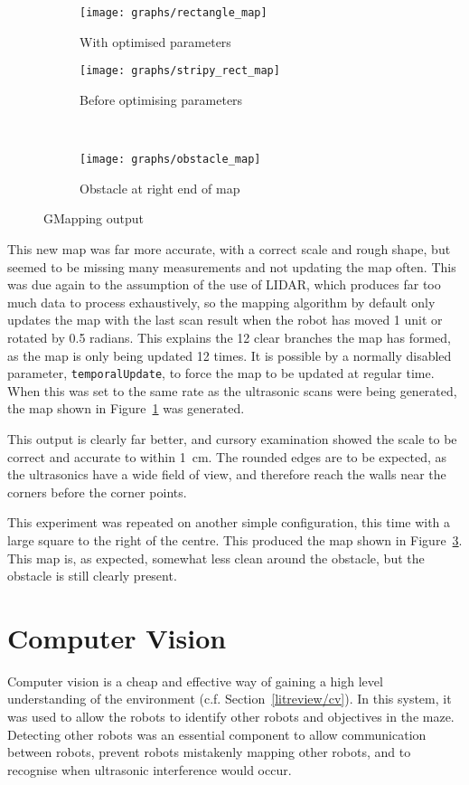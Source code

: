 \begin{figure}[!htb]
\centering
	\begin{subfigure}[b]{0.5\textwidth}
		\texttt{[image: graphs/rectangle\_map]}
		\caption{With optimised parameters}
		\label{fig:gmapping_output/rect}
	\end{subfigure}

  \centering
  \begin{subfigure}[b]{0.4\textwidth}
    \texttt{[image: graphs/stripy\_rect\_map]}
    \caption{Before optimising parameters}
    \label{fig:gmapping_output/stripy}
  \end{subfigure}
  ~
  \begin{subfigure}[b]{0.4\textwidth}
    \texttt{[image: graphs/obstacle\_map]}
    \caption{Obstacle at right end of map}
    \label{fig:gmapping_output/obstacle}
  \end{subfigure}
  \caption{GMapping output}\label{fig:gmapping_output}
\end{figure}


This new map was far more accurate, with a correct scale and rough shape, but seemed to be missing many measurements
and not updating the map often. This was due again to the assumption of the use of LIDAR, which produces far too
much data to process exhaustively, so the mapping algorithm by default only updates the map with the last scan result
when the robot has moved 1 unit or rotated by 0.5 radians. This explains the 12 clear branches the map has formed,
as the map is only being updated 12 times. It is possible by a normally disabled parameter, \verb|temporalUpdate|,
to force the map to be updated at regular time. When this was set to the same rate as the ultrasonic scans were
being generated, the map shown in Figure~\ref{fig:gmapping_output/rect} was generated.

This output is clearly far better, and cursory examination showed the scale to be correct and accurate to within
\SI{1}{cm}. The rounded edges are to be expected, as the ultrasonics have a wide field of view, and therefore
reach the walls near the corners before the corner points.

This experiment was repeated on another simple configuration, this time with a
large square to the right of the centre. This produced the map shown in
Figure~\ref{fig:gmapping_output/obstacle}. This map is, as expected, somewhat less clean around the obstacle, but the obstacle is still clearly present.

\section{Computer Vision}\label{soft/cv}
Computer vision is a cheap and effective way of gaining a high level
understanding of the environment (c.f. Section~\ref{litreview/cv}). In this system, it was used to allow the robots to
identify other robots and objectives in the maze. Detecting other
robots was an essential component to allow communication between robots,
prevent robots mistakenly mapping other robots, and to recognise when
ultrasonic interference would occur.

